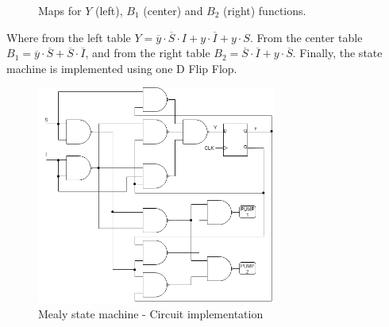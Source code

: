 \begin{figure}[H]
\begin{center}
     \begin{Karnaughvuit}
     \end{Karnaughvuit}
     \begin{Karnaughvuit}
     \end{Karnaughvuit}
     \begin{Karnaughvuit}
     \end{Karnaughvuit}
     \caption{Maps for $Y$ (left), $B_1$ (center) and $B_2$ (right) functions.}
\end{center}
\end{figure}
Where from the left table $Y = \overline{y} \cdot \overline{S} \cdot I + y \cdot \overline{I} + y \cdot S$. 
From the center table $B_1 = \overline{y} \cdot \overline{S} + \overline{S} \cdot \overline{I}$, and from the 
right table $B_2 = \overline{S} \cdot \overline{I} + y \cdot \overline{S}$.
Finally, the state machine is implemented using
one D Flip Flop.

\begin{figure}[H]
    \begin{centering}
    \includegraphics[width=0.7\textwidth]{Graficos1/1b_Compuertas_Mealy.png}
    \par\end{centering}
    \caption{Mealy state machine - Circuit implementation}
\end{figure}

